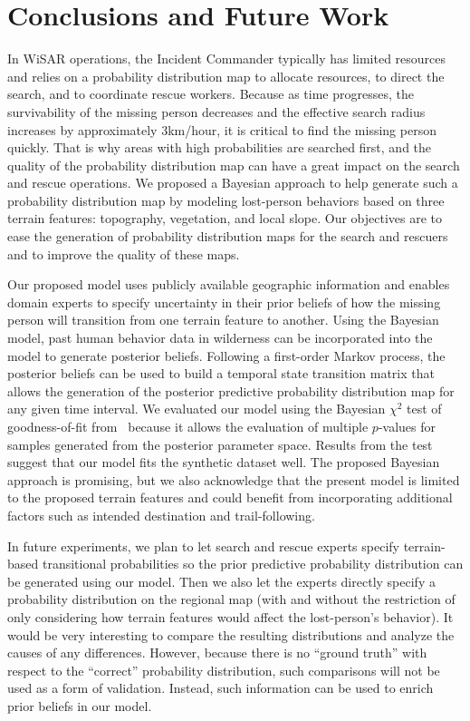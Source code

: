 \section{Conclusions and Future Work}
\label{sec:6}

In WiSAR operations, the Incident Commander typically has limited resources and relies on a probability distribution map to allocate resources, to direct the search, and to coordinate rescue workers. Because as time progresses, the survivability of the missing person decreases and the effective search radius increases by approximately 3km/hour, it is critical to find the missing person quickly. That is why areas with high probabilities are searched first, and the quality of the probability distribution map can have a great impact on the search and rescue operations. We proposed a Bayesian approach to help generate such a probability distribution map by modeling lost-person behaviors based on three terrain features: topography, vegetation, and local slope. Our objectives are to ease the generation of probability distribution maps for the search and rescuers and to improve the quality of these maps.

Our proposed model uses publicly available geographic information and enables domain experts to specify uncertainty in their prior beliefs of how the missing person will transition from one terrain feature to another. Using the Bayesian model, past human behavior data in wilderness can be incorporated into the model to generate posterior beliefs. Following a first-order Markov process, the posterior beliefs can be used to build a temporal state transition matrix that allows the generation of the posterior predictive probability distribution map for any given time interval. We evaluated our model using the Bayesian $\chi^2$ test of goodness-of-fit from~\cite{Johnson2004Bayesian} because it allows the evaluation of multiple $p$-values for samples generated from the posterior parameter space. Results from the test suggest that our model fits the synthetic dataset well. The proposed Bayesian approach is promising, but we also acknowledge that the present model is limited to the proposed terrain features and could benefit from incorporating additional factors such as intended destination and trail-following.

In future experiments, we plan to let search and rescue experts specify terrain-based transitional probabilities so the prior predictive probability distribution can be generated using our model. Then we also let the experts directly specify a probability distribution on the regional map (with and without the restriction of only considering how terrain features would affect the lost-person's behavior). It would be very interesting to compare the resulting distributions and analyze the causes of any differences. However, because there is no ``ground truth'' with respect to the ``correct'' probability distribution, such comparisons will not be used as a form of validation. Instead, such information can be used to enrich prior beliefs in our model.


